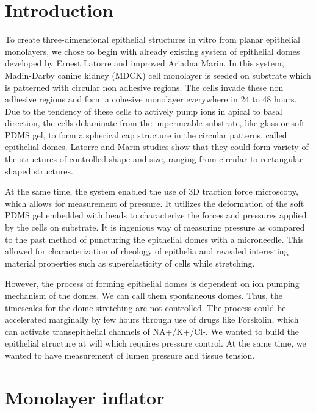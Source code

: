 \hypertarget{introduction}{%
\section{Introduction}\label{introduction1}}

To create three-dimensional epithelial structures in vitro from planar
epithelial monolayers, we chose to begin with already existing system of
epithelial domes developed by Ernest Latorre and improved Ariadna Marin.
In this system, Madin-Darby canine kidney (MDCK) cell monolayer is
seeded on substrate which is patterned with circular non adhesive
regions. The cells invade these non adhesive regions and form a cohesive
monolayer everywhere in 24 to 48 hours. Due to the tendency of these
cells to actively pump ions in apical to basal direction, the cells
delaminate from the impermeable substrate, like glass or soft PDMS gel,
to form a spherical cap structure in the circular patterns, called
epithelial domes. Latorre and Marin studies show that they could form
variety of the structures of controlled shape and size, ranging from
circular to rectangular shaped structures.

At the same time, the system enabled the use of 3D traction force
microscopy, which allows for measurement of pressure. It utilizes the
deformation of the soft PDMS gel embedded with beads to characterize the
forces and pressures applied by the cells on substrate. It is ingenious
way of measuring pressure as compared to the past method of puncturing
the epithelial domes with a microneedle. This allowed for
characterization of rheology of epithelia and revealed interesting
material properties such as superelasticity of cells while stretching.

However, the process of forming epithelial domes is dependent on ion
pumping mechanism of the domes. We can call them spontaneous domes.
Thus, the timescales for the dome stretching are not controlled. The
process could be accelerated marginally by few hours through use of
drugs like Forskolin, which can activate transepithelial channels of
NA+/K+/Cl-. We wanted to build the epithelial structure at will which
requires pressure control. At the same time, we wanted to have
measurement of lumen pressure and tissue tension.

\hypertarget{monolayer-inflator}{%
\section{Monolayer inflator}\label{monolayer-inflator}}

